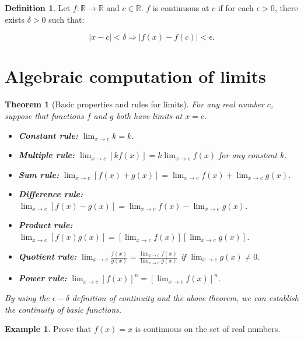 \documentclass[
]{book}
\newtheorem{theorem}{Theorem}[chapter]
\theoremstyle{definition}
\newtheorem{definition}{Definition}[chapter]
\theoremstyle{definition}
\newtheorem{example}{Example}[chapter]
\theoremstyle{definition}
\theoremstyle{definition}
\theoremstyle{remark}
\begin{document}
\begin{definition}
\protect\hypertarget{def:unnamed-chunk-21}{}\label{def:unnamed-chunk-21}Let \(f: \mathbb{R} \to \mathbb{R}\) and
\(c \in \mathbb{R}\). \(f\) is continuous at \(c\) if for each \(\epsilon > 0\),
there exists \(\delta > 0\) such that:

\[|x - c| < \delta \Rightarrow |f(x) - f(c)| < \epsilon.\]
\end{definition}

\section{Algebraic computation of limits}\label{algebraic-computation-of-limits}

\begin{theorem}[Basic properties and rules for limits]
\protect\hypertarget{thm:unnamed-chunk-22}{}\label{thm:unnamed-chunk-22}For any real number \(c\), suppose that functions \(f\) and \(g\) both have
limits at \(x = c\).

\begin{itemize}
\item
  \textbf{Constant rule:} \(\lim_{{x \to c}} k = k\).
\item
  \textbf{Multiple rule:}
  \(\lim_{{x \to c}} [kf(x)] = k \lim_{{x \to c}} f(x)\) for any
  constant \(k\).
\item
  \textbf{Sum rule:}
  \(\lim_{{x \to c}} [f(x) + g(x)] = \lim_{{x \to c}} f(x) + \lim_{{x \to c}} g(x)\).
\item
  \textbf{Difference rule:}
  \(\lim_{{x \to c}} [f(x) - g(x)] = \lim_{{x \to c}} f(x) - \lim_{{x \to c}} g(x)\).
\item
  \textbf{Product rule:}
  \(\lim_{{x \to c}} [f(x) g(x)] = [\lim_{{x \to c}} f(x)][\lim_{{x \to c}} g(x)]\).
\item
  \textbf{Quotient rule:}
  \(\lim_{{x \to c}} \frac{f(x)}{g(x)} = \frac{\lim_{{x \to c}} f(x)}{\lim_{{x \to c}} g(x)}\)
  if \(\lim_{{x \to c}} g(x) \neq 0\).
\item
  \textbf{Power rule:}
  \(\lim_{{x \to c}} [f(x)]^n = [\lim_{{x \to c}} f(x)]^n\).
\end{itemize}

By using the \(\epsilon - \delta\) definition of continuity and the above
theorem, we can establish the continuity of basic functions.
\end{theorem}

\begin{example}
\protect\hypertarget{exm:unnamed-chunk-23}{}\label{exm:unnamed-chunk-23}Prove that \(f(x) = x\) is continuous on the set of
real numbers.
\end{example}
\end{document}
